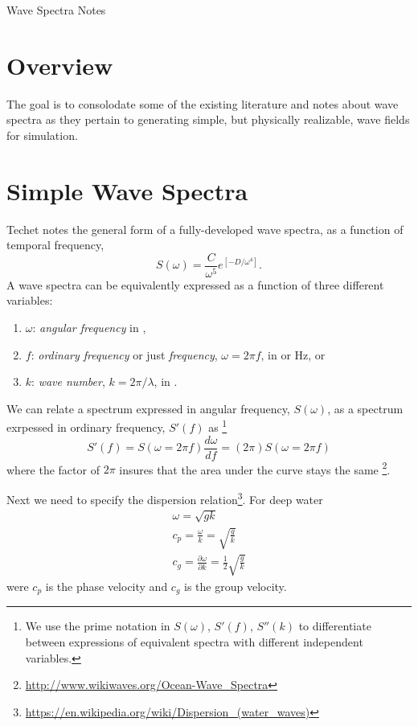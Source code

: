 \documentclass[11pt]{article}
\newcommand{\proposaltitle}{Wave Spectra Notes}
\begin{document}
\newpage
\setcounter{page}{1}
\begin{center}
{\huge \proposaltitle}
\end{center}

\section{Overview}
The goal is to consolodate some of the existing literature and notes about wave spectra as they pertain to generating simple, but physically realizable, wave fields for simulation.

\section{Simple Wave Spectra}
Techet notes the general form of a fully-developed wave spectra, as a function of temporal frequency,
\begin{equation}
S(\omega) = \frac{C}{\omega^5} e^{\left[ -D/\omega^4 \right]}.
\label{e:form}
\end{equation}
A wave spectra can be equivalently expressed as a function of three different variables:
\begin{enumerate}
\item $\omega$: \emph{angular frequency} in ,
\item $f$: \emph{ordinary frequency} or just \emph{frequency}, $\omega=2 \pi f$, in  or \unit[]{Hz}, or
\item $k$: \emph{wave number}, $k = 2 \pi/\lambda$, in .
\end{enumerate}

We can relate a spectrum expressed in angular frequency, $S(\omega)$, as a spectrum exrpessed in ordinary frequency, $S'(f)$ as \footnote{We use the prime notation  in $S(\omega)$, $S'(f)$, $S''(k)$ to differentiate between expressions of equivalent spectra with different independent variables.}
\[ S'(f) = S(\omega=2 \pi f) \frac{d\omega}{df} = (2 \pi) S(\omega=2 \pi f)\]
where the factor of $2 \pi$ insures that the area under the curve stays the same \footnote{\url{http://www.wikiwaves.org/Ocean-Wave_Spectra}}.

Next we need to specify the dispersion relation\footnote{\url{https://en.wikipedia.org/wiki/Dispersion_(water_waves)}}.  For deep water 
\begin{eqnarray}
\omega = \sqrt{gk} \\
c_p = \frac{\omega}{k}=\sqrt{\frac{g}{k}} \\
c_g = \frac{\partial \omega}{\partial k} = \frac{1}{2} \sqrt{\frac{g}{k}}
\end{eqnarray}
were $c_p$ is the phase velocity and $c_g$ is the group velocity.
\end{document}
